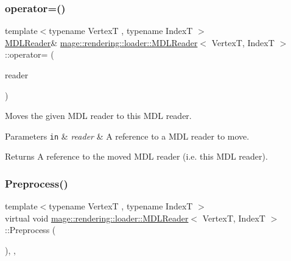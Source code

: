\subsubsection{\texorpdfstring{operator=()}{operator=()}\hspace{0.1cm}{\footnotesize\ttfamily [2/2]}}
{\footnotesize\ttfamily template$<$typename VertexT , typename IndexT $>$ \\
\mbox{\hyperlink{classmage_1_1rendering_1_1loader_1_1_m_d_l_reader}{M\+D\+L\+Reader}}\& \mbox{\hyperlink{classmage_1_1rendering_1_1loader_1_1_m_d_l_reader}{mage\+::rendering\+::loader\+::\+M\+D\+L\+Reader}}$<$ VertexT, IndexT $>$\+::operator= (\begin{DoxyParamCaption}\item[{\mbox{\hyperlink{classmage_1_1rendering_1_1loader_1_1_m_d_l_reader}{M\+D\+L\+Reader}}$<$ VertexT, IndexT $>$ \&\&}]{reader }\end{DoxyParamCaption})\hspace{0.3cm}{\ttfamily [delete]}}

Moves the given M\+DL reader to this M\+DL reader.


\begin{DoxyParams}[1]{Parameters}
\mbox{\tt in}  & {\em reader} & A reference to a M\+DL reader to move. \\
\hline
\end{DoxyParams}
\begin{DoxyReturn}{Returns}
A reference to the moved M\+DL reader (i.\+e. this M\+DL reader). 
\end{DoxyReturn}
\mbox{\label{classmage_1_1rendering_1_1loader_1_1_m_d_l_reader_a397f0c0eedc56c983fc3a7074aa4e577}} 
\subsubsection{\texorpdfstring{Preprocess()}{Preprocess()}}
{\footnotesize\ttfamily template$<$typename VertexT , typename IndexT $>$ \\
virtual void \mbox{\hyperlink{classmage_1_1rendering_1_1loader_1_1_m_d_l_reader}{mage\+::rendering\+::loader\+::\+M\+D\+L\+Reader}}$<$ VertexT, IndexT $>$\+::Preprocess (\begin{DoxyParamCaption}{ }\end{DoxyParamCaption})\hspace{0.3cm}{\ttfamily [override]}, {\ttfamily [private]}, {\ttfamily [virtual]}}

